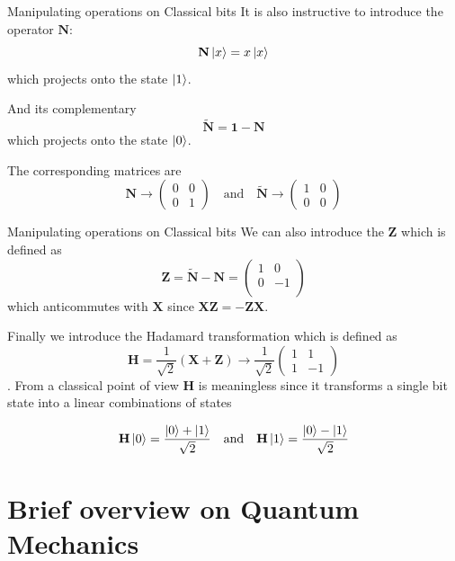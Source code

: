 \documentclass[11p,aspectratio=169]{beamer}
\begin{document}
\begin{frame}{Manipulating operations on Classical bits}
    It is also instructive to introduce the operator $\textbf{N}$:
    $$ \textbf{N} \ket{x} = x \ket{x}$$
    which projects onto the state $\ket{1}$.


    And its complementary
    $$ \tilde{\textbf{N}} = \textbf{1} - \textbf{N}$$
    which projects onto the state $\ket{0}$.


    The corresponding matrices are
    $$ \textbf{N} \rightarrow \begin{pmatrix}
        0 & 0 \\
        0 & 1 
    \end{pmatrix} \quad \text{and} \quad
     \tilde{\textbf{N}} \rightarrow \begin{pmatrix}
        1 & 0 \\
        0 & 0 
    \end{pmatrix} $$

\end{frame}

\begin{frame}{Manipulating operations on Classical bits}
    We can also introduce the $\textbf{Z}$ which is defined as
    $$ \textbf{Z} = \tilde{\textbf{N}} - \textbf{N} = 
    \begin{pmatrix}
        1 & 0 \\
        0 & -1 \\
    \end{pmatrix}$$ 
    which anticommutes with $\textbf{X}$ since $ \textbf{X}\textbf{Z} = - \textbf{Z}
    \textbf{X}$.

    Finally we introduce the Hadamard transformation which is defined as 
    $$ \textbf{H} = \frac{1}{\sqrt{2}}( \textbf{X} + \textbf{Z}) \rightarrow 
    \frac{1}{\sqrt{2}}\begin{pmatrix}
        1 & 1 \\
        1 & -1 
    \end{pmatrix}$$ .
    From a classical point of view $\textbf{H}$ is meaningless since it transforms a single
    bit state into a linear combinations of states
 
    $$ \textbf{H} \ket{0} = \frac{\ket{0} + \ket{1}}{\sqrt{2}} \quad \text{and}
    \quad 
    \textbf{H} \ket{1} = \frac{\ket{0} - \ket{1}}{\sqrt{2}}
    $$

     
\end{frame}

    \section{Brief overview on Quantum Mechanics}
\end{document}
